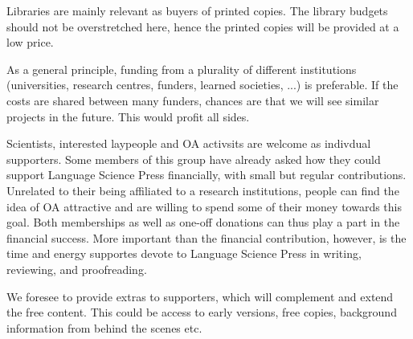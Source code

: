 \documentclass[output=guidelines,nonflat,smallfont,
draftmode
]{langsci/langscibook}
\begin{document}
{Libraries are mainly relevant as buyers of printed copies. The library budgets should not be overstretched here, hence the printed copies will be provided at a low price. 

As a general principle, funding from a plurality of different institutions (universities, research centres, funders, learned societies, ...) is preferable. If the costs are shared between many funders, chances are that we will see similar projects in the future. This would profit all sides.

Scientists, interested laypeople and OA activsits are welcome as indivdual supporters. Some members of this group have already asked how they could support Language Science Press financially, with small but regular contributions. Unrelated to their being affiliated to a research institutions, people can find the idea of OA attractive and are willing to spend some of their money towards this goal. Both memberships as well as one-off donations can thus play a part in the financial success. More important than the financial contribution, however, is the time and energy supportes devote to Language Science Press in writing, reviewing, and proofreading.

We foresee to provide extras to supporters, which will complement and extend the free content. This could be access to early versions, free copies, background information from behind the scenes etc. 
}
\end{document}
